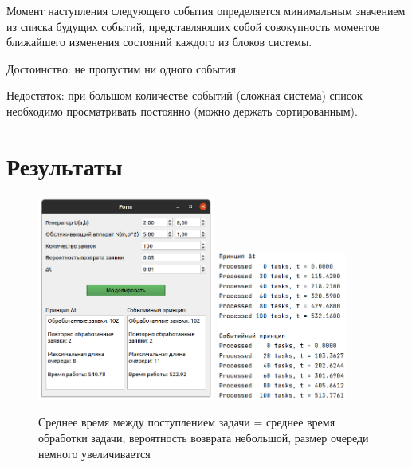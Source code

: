 Момент наступления следующего события определяется минимальным значением из списка будущих событий, представляющих собой совокупность моментов ближайшего изменения состояний каждого из блоков системы.


Достоинство: не пропустим ни одного события

Недостаток: при большом количестве событий (сложная система) список необходимо просматривать
постоянно (можно держать сортированным).

\section{Результаты}

\begin{figure}[h!]
\centering
\includegraphics[width=0.52\textwidth]{4/ex_1}
\includegraphics[width=0.38\textwidth]{4/ex_1_log}
\caption{Среднее время между поступлением задачи = среднее время обработки задачи, вероятность возврата небольшой, размер очереди немного увеличивается}
\end{figure}

